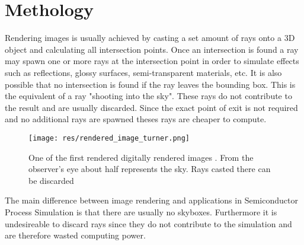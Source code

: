 \section{Methology}

Rendering images is usually achieved by casting a set amount of rays onto a 3D object and calculating all intersection points.
Once an intersection is found a ray may spawn one or more rays at the intersection point in order to simulate effects such as reflections, glossy surfaces, semi-transparent materials, etc.
It is also possible that no intersection is found if the ray leaves the bounding box. This is the equivalent of a ray "shooting into the sky".
These rays do not contribute to the result and are usually discarded. 
Since the exact point of exit is not required and no additional rays are spawned theses rays are cheaper to compute.


\begin{figure}[H]
	\centering
	\texttt{[image: res/rendered\_image\_turner.png]}
	\caption{One of the first rendered digitally rendered images \cite{rendering_turner}. From the observer's eye about half represents the sky. Rays casted there can be discarded}
	\label{fig::nvidia_benchmark}
\end{figure}


The main difference between image rendering and applications in Semiconductor Process Simulation is that there are usually no skyboxes.
Furthermore it is undesireable to discard rays since they do not contribute to the simulation and are therefore wasted computing power.



